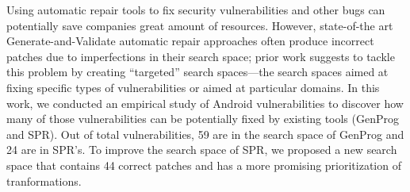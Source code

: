Using automatic repair tools to fix security vulnerabilities and other bugs can potentially save companies great amount of resources. However, state-of-the art Generate-and-Validate automatic repair approaches often produce incorrect patches due to imperfections in their search space; prior work suggests to tackle this problem by creating ``targeted'' search spaces---the search spaces aimed at fixing specific types of vulnerabilities or aimed at particular domains. In this work, we conducted an empirical study of \numvuln Android vulnerabilities to discover how many of those vulnerabilities can be potentially fixed by existing tools (GenProg and SPR). Out of total \numvuln vulnerabilities, 59 are in the search space of GenProg and 24 are in SPR's. To improve the search space of SPR, we proposed a new search space that contains 44 correct patches and has a more promising prioritization of tranformations.
